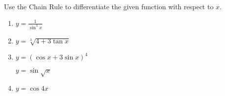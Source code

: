 Use the Chain Rule to differentiate the given function with respect to $x$.   

\begin{enumerate}
\item   $y = \frac{1}{\sin^3x}$

\item  $y = \sqrt[3]{4+3\tan x}$

\item  $y = (\cos x + 3\sin x)^4$

  $y = \sin\sqrt{x}$

%


\item  $y = \cos4x$
\end{enumerate}
